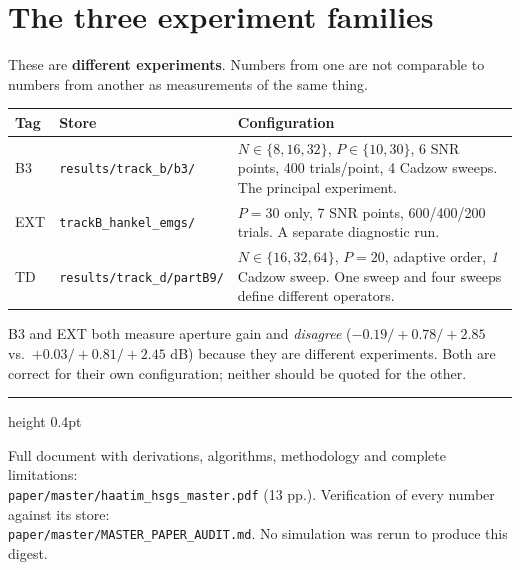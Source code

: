 \documentclass[11pt]{article}
\begin{document}
\section{The three experiment families}\label{sec:families}

These are \textbf{different experiments}. Numbers from one are not comparable
to numbers from another as measurements of the same thing.

\begin{table}[!ht]
\centering
\small
\begin{tabular}{llp{7.4cm}}
\toprule
\textbf{Tag} & \textbf{Store} & \textbf{Configuration} \\
\midrule
B3 & \texttt{results/track\_b/b3/} &
$N\in\{8,16,32\}$, $P\in\{10,30\}$, 6 SNR points, 400 trials/point,
4 Cadzow sweeps. The principal experiment. \\
\addlinespace
EXT & \texttt{trackB\_hankel\_emgs/} &
$P=30$ only, 7 SNR points, 600/400/200 trials. A separate diagnostic run. \\
\addlinespace
TD & \texttt{results/track\_d/partB9/} &
$N\in\{16,32,64\}$, $P=20$, adaptive order, \emph{1} Cadzow sweep. One sweep and
four sweeps define different operators. \\
\bottomrule
\end{tabular}
\end{table}

B3 and EXT both measure aperture gain and \emph{disagree}
($-0.19/+0.78/+2.85$ vs.\ $+0.03/+0.81/+2.45$ dB) because they are different
experiments. Both are correct for their own configuration; neither should be
quoted for the other.

\vspace{10pt}
\hrule height 0.4pt
\vspace{6pt}

{\small\textcolor{tag}{Full document with derivations, algorithms, methodology
and complete limitations:\\
\texttt{paper/master/haatim\_hsgs\_master.pdf} (13 pp.). Verification of every
number against its store:\\
\texttt{paper/master/MASTER\_PAPER\_AUDIT.md}. No simulation was rerun to
produce this digest.}\par}
\end{document}
